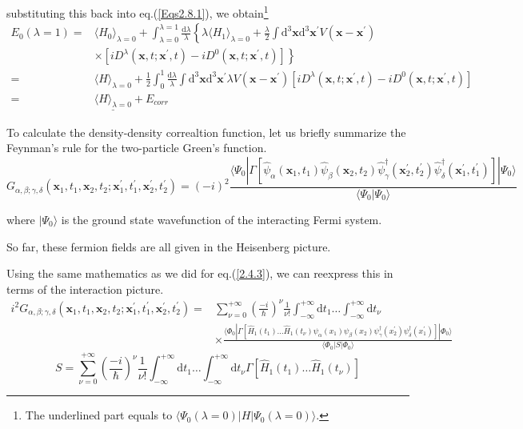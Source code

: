 substituting this back into eq.(\ref{Eqs2.8.1}), we obtain\footnote{The underlined part equals to $\langle \Psi_0(\lambda=0)|H|\Psi_0(\lambda=0)\rangle$.}
\begin{equation} \label{Eqs2.8.3} \begin{split}
E_0(\lambda=1) =& \langle H_0 \rangle_{\lambda=0} + \int_{\lambda=0}^{\lambda=1} \frac{\mathrm{d}\lambda}{\lambda} \left\{ 
\lambda\langle H_1 \rangle_{\lambda=0} + \frac{\lambda}{2}\int \mathrm{d}^3 \mathbf{x} \mathrm{d}^3 \mathbf{x}^{'} V(\mathbf{x}-\mathbf{x}^{'})\right. \\&\left.\times \left[ i D^\lambda(\mathbf{x},t;\mathbf{x}^{'},t)- i D^0(\mathbf{x},t;\mathbf{x}^{'},t)\right] \right\}\\
=& \langle H \rangle_{\lambda=0} + \frac{1}{2}\int_0^1 \frac{\mathrm{d}\lambda}{\lambda} \int \mathrm{d}^3 \mathbf{x} \mathrm{d}^3 \mathbf{x}^{'} \lambda V(\mathbf{x}-\mathbf{x}^{'})\left[ i D^\lambda(\mathbf{x},t;\mathbf{x}^{'},t)- i D^0(\mathbf{x},t;\mathbf{x}^{'},t) \right]\\
=&\underline{\langle H \rangle_{\lambda=0}} + E_{corr}
\end{split} \end{equation}

To calculate the density-density correaltion function, let us briefly summarize the Feynman's rule for the two-particle Green's function.
\begin{equation} \label{Eqs2.8.4}
G_{\alpha,\beta;\gamma,\delta}(\mathbf{x}_1,t_1,\mathbf{x}_2,t_2;\mathbf{x}_1^{'},t_1^{'},\mathbf{x}_2^{'},t_2^{'}) = (-i)^2 \frac{\langle \Psi_0 | \Gamma[\hat{\psi}_\alpha(\mathbf{x}_1,t_1) \hat{\psi}_\beta(\mathbf{x}_2, t_2) \hat{\psi}_\gamma^\dagger(\mathbf{x}_2^{'},t_2^{'}) \hat{\psi}_\delta^\dagger(\mathbf{x}_1^{'},t_1^{'})]|\Psi_0\rangle}{\langle \Psi_0 | \Psi_0 \rangle}
\end{equation}

where $| \Psi_0 \rangle$ is the ground state wavefunction of the interacting Fermi system.

So far, these fermion fields are all given in the Heisenberg picture.

Using the same mathematics as we did for eq.(\ref{2.4.3}), we can reexpress this in terms of the interaction picture.
\[ \begin{split} i^2 G_{\alpha,\beta;\gamma,\delta}(\mathbf{x}_1,t_1,\mathbf{x}_2,t_2;\mathbf{x}_1^{'},t_1^{'},\mathbf{x}_2^{'},t_2^{'}) =& \sum_{\nu=0}^{+\infty} \left( \frac{-i}{\hbar} \right)^\nu \frac{1}{\nu!} \int_{-\infty}^{+\infty}\mathrm{d}t_1 \ldots \int_{-\infty}^{+\infty}\mathrm{d}t_\nu \\
&\times \frac{\langle \Phi_0 | \Gamma[\hat{H}_1(t_1)\ldots\hat{H}_1(t_\nu)\psi_\alpha(x_1) \psi_\beta(x_2) \psi_\gamma^\dagger(x_2^{'}) \psi_\delta^\dagger(x_1^{'})]|\Phi_0\rangle}{\langle \Phi_0 | S | \Phi_0  \rangle}
\end{split} \]
\[ S = \sum_{\nu=0}^{+\infty}\left( \frac{-i}{\hbar} \right)^\nu \frac{1}{\nu!} \int_{-\infty}^{+\infty}\mathrm{d}t_1 \ldots \int_{-\infty}^{+\infty}\mathrm{d}t_\nu \Gamma[\hat{H}_1(t_1)\ldots\hat{H}_1(t_\nu)] \]


